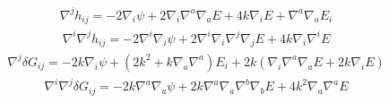 \documentclass[10pt,letterpaper]{article}
\numberwithin{equation}{section}
\begin{document}
\begin{eqnarray}
\nabla^j h_{ij} = -2\nabla_i \psi + 2\nabla_i \nabla^a\nabla_a E +4k\nabla_i E + \nabla^a \nabla_a E_i
\end{eqnarray}
\begin{eqnarray}
\nabla^i \nabla^j h_{ij} = -2\nabla^i \nabla_i \psi + 2\nabla^i\nabla_i \nabla^j\nabla_j E + 4k \nabla_i \nabla^i E
\label{hijdt}
\end{eqnarray}
\begin{eqnarray}
\nabla^j \delta G_{ij} =  -2k\nabla_i \psi + (2k^2+k\nabla_a\nabla^a )E_i + 2k( \nabla_i \nabla^a\nabla_a E + 2k \nabla_i E)
\end{eqnarray}
\begin{eqnarray}
\nabla^i \nabla^j \delta G_{ij} = -2k\nabla^a \nabla_a \psi + 2k \nabla^a\nabla_a\nabla^b \nabla_b E + 4k^2\nabla_a\nabla^a E
\end{eqnarray}

\end{document}
